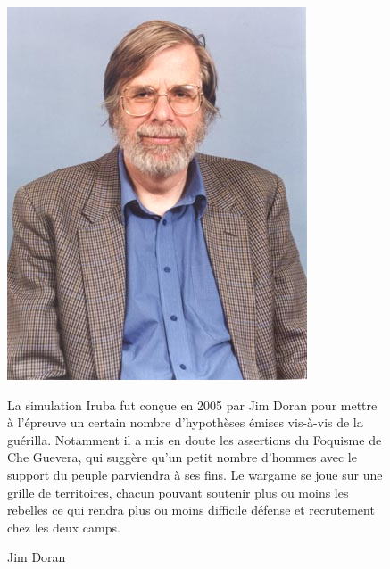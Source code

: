 \documentclass{article}
\begin{document}
\begin{center}
\begin{figure}[H]
\hfill
\begin{minipage}[H]{0.25\linewidth}
	\centering
	\includegraphics[width=\textwidth]{../ressources/doran}
	\caption{Jim Doran}
\end{minipage}
\hfill
\begin{minipage}[H]{0.7\linewidth}
La simulation Iruba fut conçue en 2005 par Jim Doran pour mettre à l'épreuve un certain nombre d'hypothèses émises vis-à-vis de la guérilla. Notamment il a mis en doute les assertions du Foquisme de Che Guevera, qui suggère qu'un petit nombre d'hommes avec le support du peuple parviendra à ses fins.
Le \og{}wargame\fg{} se joue sur une grille de territoires, chacun pouvant soutenir plus ou moins les rebelles ce qui rendra plus ou moins difficile défense et recrutement chez les deux camps.
\end{minipage}
\hfill
\end{figure}
\end{center}
\end{document}
